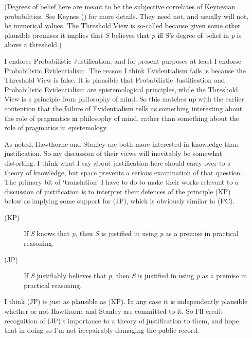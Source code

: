 \documentclass[
  11pt,
  letterpaper,
  DIV=11,
  numbers=noendperiod,
  oneside]{scrartcl}
\begin{document}
(Degrees of belief here are meant to be the subjective correlates of
Keynesian probabilities. See Keynes ()
for more details. They need not, and usually will not, be numerical
values. The Threshold View is so-called because given some other
plausible premises it implies that \(S\) believes that \emph{p} iff S's
degree of belief in \emph{p} is above a threshold.)

I endorse Probabilistic Justification, and for present purposes at least
I endorse Probabilistic Evidentialism. The reason I think Evidentialism
fails is because the Threshold View is false. It is plausible that
Probabilistic Justification and Probabilistic Evidentialism are
epistemological principles, while the Threshold View is a principle from
philosophy of mind. So this matches up with the earlier contention that
the failure of Evidentialism tells us something interesting about the
role of pragmatics in philosophy of mind, rather than something about
the role of pragmatics in epistemology.

As noted, Hawthorne and Stanley are both more interested in knowledge
than justification. So my discussion of their views will inevitably be
somewhat distorting. I think what I say about justification here should
carry over to a theory of knowledge, but space prevents a serious
examination of that question. The primary bit of `translation' I have to
do to make their works relevant to a discussion of justification is to
interpret their defences of the principle (KP) below as implying some
support for (JP), which is obviously similar to (PC).

\begin{description}
\item[(KP)]
If \emph{S} knows that \emph{p}, then \emph{S} is justified in using
\emph{p} as a premise in practical reasoning.
\item[(JP)]
If \emph{S} justifiably believes that \emph{p}, then \emph{S} is
justified in using \emph{p} as a premise in practical reasoning.
\end{description}

I think (JP) is just as plausible as (KP). In any case it is
independently plausible whether or not Hawthorne and Stanley are
committed to it. So I'll credit recognition of (JP)'s importance to a
theory of justification to them, and hope that in doing so I'm not
irrepairably damaging the public record.
\end{document}
